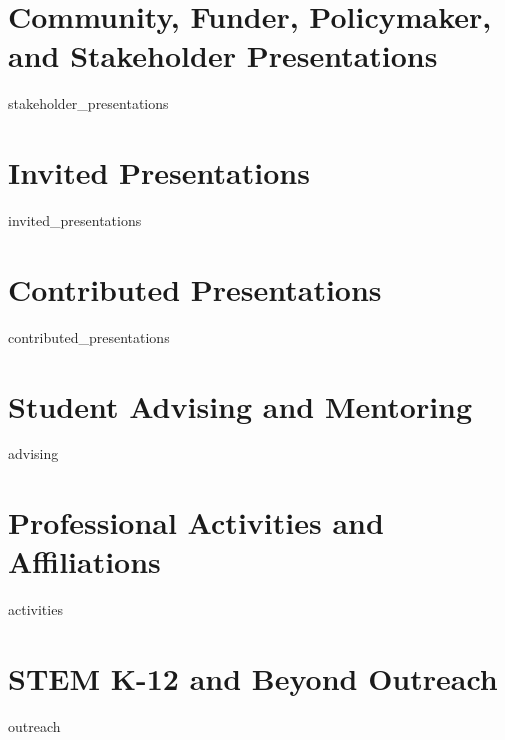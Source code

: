 \documentclass[11pt, letterpaper, roman]{moderncv} %
\begin{document}
\section{Community, Funder, Policymaker, and Stakeholder Presentations}
{stakeholder_presentations}

\section{Invited Presentations}
{invited_presentations}

\section{Contributed Presentations}
{contributed_presentations}

\section{Student Advising and Mentoring}
{advising}

\vspace{-2.5pt}
\section{Professional Activities and Affiliations}
{activities}

\section{STEM K-12 and Beyond Outreach}
{outreach}
\end{document}

